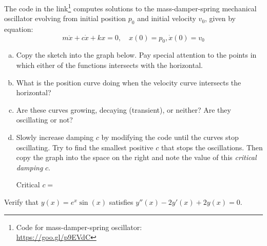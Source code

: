   \begin{sagequestion}
    The \sage code in the link\footnote{Code for mass-damper-spring oscillator: \\ 
    \url{https://goo.gl/p9EVdC}} computes solutions to the mass-damper-spring mechanical oscillator
    evolving from initial position \(p_{0}\) and initial velocity \(v_{0}\), given by equation:
    \begin{equation}
      \label{eq:w5-1}
      m \ddot x + c \dot x + k x = 0,\quad x(0)=p_{0}, \dot x(0) = v_{0}
    \end{equation}

    \begin{enumerate}[(a)]
      \item Copy the sketch into the graph below. Pay special attention to the
        points in which either of the functions intersects with the horizontal.
        \begin{center}
        \end{center}

      \item What is the position curve doing when the velocity curve intersects the horizontal?
        \solspace{0.25in}

      \item Are these curves growing, decaying (transient), or neither? Are they oscillating or not?
        \solspace{0.25in}

      \item Slowly increase damping \(c\) by modifying the code until the curves stop oscillating.
        Try to find the smallest positive \(c\) that stops the oscillations.
        Then copy the graph into the space on the right and note the value of this \emph{critical damping} \(c\).
        \begin{center}

          \vspace{0.01em}
          Critical \(c = \)
        \end{center}
    \end{enumerate}
  \end{sagequestion}

  \begin{question}
    Verify that \(y(x) = e^{x}\sin(x)\) satisfies \(y''(x) - 2 y'(x) + 2 y(x) = 0\).
  \end{question}
  \solspace{.25in}

